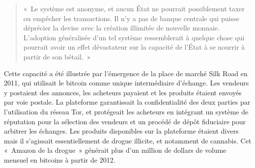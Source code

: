 \begin{quote}
«~Le système est anonyme, et aucun État ne pourrait possiblement taxer ou empêcher les transactions. Il n'y a pas de banque centrale qui puisse déprécier la devise avec la création illimitée de nouvelle monnaie. L'adoption généralisée d'un tel système ressemblerait à quelque chose qui pourrait avoir un effet dévastateur sur la capacité de l'État à se nourrir à partir de son bétail.~»
\end{quote}

Cette capacité a été illustrée par l'émergence de la place de marché Silk Road en 2011, qui utilisait le bitcoin comme unique intermédiaire d'échange. Les vendeurs y postaient des annonces, les acheteurs payaient et les produits étaient envoyés par voie postale. La plateforme garantissait la confidentialité des deux parties par l'utilisation du réseau Tor, et protégeait les acheteurs en intégrant un système de réputation pour la sélection des vendeurs et un procédé de dépôt fiduciaire pour arbitrer les échanges. Les produits disponibles sur la plateforme étaient divers mais il s'agissait essentiellement de drogue illicite, et notamment de cannabis. Cet «~Amazon de la drogue~» générait plus d'un million de dollars de volume mensuel en bitcoins à partir de 2012.

